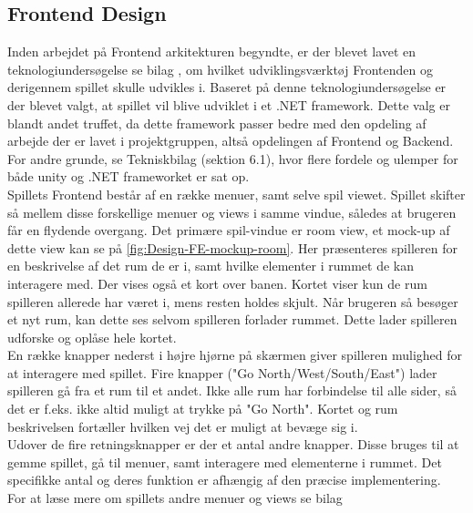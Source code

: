 \subsection{Frontend Design}
\label{ssec:FE Design}

Inden arbejdet på Frontend arkitekturen begyndte, er der blevet lavet en teknologiundersøgelse se bilag \parencite[][Section 8]{TekniskBilag}, om hvilket udviklingsværktøj Frontenden og derigennem spillet skulle udvikles i. Baseret på denne teknologiundersøgelse er der blevet valgt, at spillet vil blive udviklet i et .NET framework. Dette valg er blandt andet truffet, da dette framework passer bedre med den opdeling af arbejde der er lavet i projektgruppen, altså opdelingen af Frontend og Backend. For andre grunde, se Tekniskbilag (sektion 6.1), hvor flere fordele og ulemper for både unity og .NET frameworket er sat op.\\

\noindent Spillets Frontend består af en række menuer, samt selve spil viewet. Spillet skifter så mellem disse forskellige menuer og views i samme vindue, således at brugeren får en flydende overgang.
Det primære spil-vindue er room view, et mock-up af dette view kan se på \autoref{fig:Design-FE-mockup-room}. Her præsenteres spilleren for en beskrivelse af det rum de er i, samt hvilke elementer i rummet de kan interagere med. Der vises også et kort over banen. Kortet viser kun de rum spilleren allerede har været i, mens resten holdes skjult. Når brugeren så besøger et nyt rum, kan dette ses selvom spilleren forlader rummet. Dette lader spilleren udforske og oplåse hele kortet.\\
En række knapper nederst i højre hjørne på skærmen giver spilleren mulighed for at interagere med spillet. Fire knapper ("Go {North/West/South/East}") lader spilleren gå fra et rum til et andet. Ikke alle rum har forbindelse til alle sider, så det er f.eks. ikke altid muligt at trykke på "Go North". Kortet og rum beskrivelsen fortæller hvilken vej det er muligt at bevæge sig i.\\
Udover de fire retningsknapper er der et antal andre knapper. Disse bruges til at gemme spillet, gå til menuer, samt interagere med elementerne i rummet. Det specifikke antal og deres funktion er afhængig af den præcise implementering.\\

\noindent For at læse mere om spillets andre menuer og views se bilag \parencite[][Section 9.2]{TekniskBilag}

